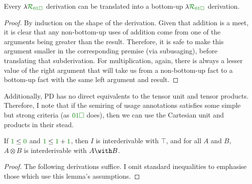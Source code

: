 \begin{lemma}
  Every $\name_{\instPD}$ derivation can be translated into a bottom-up
  $\name_{\instPD}$ derivation.
\end{lemma}
\begin{proof}
  By induction on the shape of the derivation.
  Given that addition is a meet, it is clear that any non-bottom-up uses of
  addition come from one of the arguments being greater than the result.
  Therefore, it is safe to make this argument smaller in the corresponding
  premise (via subusaging), before translating that subderivation.
  For multiplication, again, there is always a lesser value of the right
  argument that will take us from a non-bottom-up fact to a bottom-up fact with
  the same left argument and result.
\end{proof}

Additionally, PD has no direct equivalents to the tensor unit and tensor
products.
Therefore, I note that if the semiring of usage annotations satisfies some
simple but strong criteria (as $\instPD$ does), then we can use the Cartesian
unit and products in their stead.

\begin{lemma}\label{thm:top-meet}
  If $\gr1 \leq \gr0$ and $\gr1 \leq \gr1 + \gr1$, then $I$ is interderivable
  with $\top$, and for all $A$ and $B$, $A \otimes B$ is interderivable with
  $A \with B$.
\end{lemma}
\begin{proof}
  The following derivations suffice.
  I omit standard inequalities to emphasise those which use this lemma's
  assumptions.
\end{proof}

